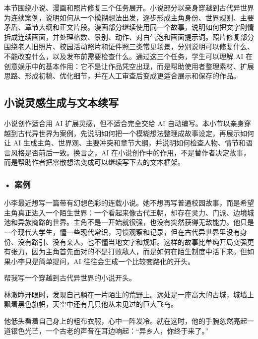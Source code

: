本节围绕小说、漫画和照片修复三个任务展开。小说部分以亲身穿越到古代异世界为连续案例，说明如何从一个模糊想法出发，逐步形成主角身份、世界规则、主要矛盾、章节大纲和正文片段。漫画部分继续使用同一个故事，说明如何把文字剧情拆成连续画面，并处理格数、景别、动作、对白气泡和画面提示词。照片修复部分围绕老人旧照片、校园活动照片和证件照三类常见场景，分别说明可以修复什么、不能改变什么，以及发布前需要检查什么。通过这三个任务，学生可以理解 AI 在创意娱乐中的基本作用：它不是让作品凭空出现，而是帮助使用者整理素材、扩展思路、形成初稿、优化细节，并在人工审查后变成更适合展示和保存的作品。


\subsection{小说灵感生成与文本续写}

小说创作适合用 AI 扩展灵感，但不适合完全交给 AI 自动编写。本小节以亲身穿越到古代异世界为案例，先说明如何把一个模糊想法整理成故事设定，再展示如何让 AI 生成主角、世界观、主要冲突和章节大纲，并说明如何检查人物、情节和语言风格是否前后一致。换言之，AI 在小说创作中的作用，不是替作者决定故事，而是帮助作者把零散想法变成可以继续写下去的文本框架。

\subsubsection*{\textbf{• 案例}}

小李最近想写一篇带有幻想色彩的连载小说。她不想再写普通校园故事，而是希望主角真正进入一个陌生世界：一个看起来像古代王朝，却存在灵力、门派、边境城池和异族商路的世界。主角不是一开始就很强，也没有突然获得无敌能力。他只是一个现代大学生，懂一些现代常识，习惯观察和记录，但在古代异世界里没有身份、没有路引、没有亲人，也不懂当地文字和规矩。这样的故事比单纯开局变强更有张力，因为主角首先面对的不是打败敌人，而是如何在陌生制度中活下来。但如果小李只是简单提问，AI 往往会生成一个比较套路化的开头。

\begin{userbox}
帮我写一个穿越到古代异世界的小说开头。
\end{userbox}

\begin{aibox}
林澈睁开眼时，发现自己躺在一片陌生的荒野上。远处是一座高大的古城，城墙上飘着黑色旗帜，天空中还有几只他从未见过的巨大飞鸟。

他低头看着自己身上的粗布衣服，心中一阵发冷。就在这时，他的手腕忽然亮起一道银色光芒，一个古老的声音在耳边响起：``异乡人，你终于来了。''
\end{aibox}

